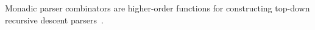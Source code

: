 
Monadic parser combinators are higher-order functions for constructing top-down recursive descent parsers~\cite{Burge1975-BURRPT, hutton1996monadic, leijen2001parsec, generalparsercombs}.





